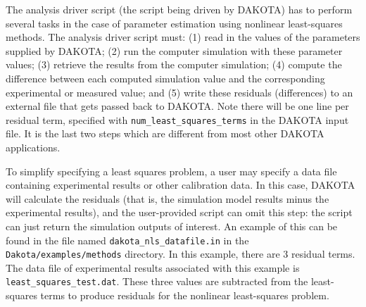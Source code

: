 The analysis driver script (the script being driven by DAKOTA) 
has to perform several tasks in the case of parameter estimation 
using nonlinear least-squares methods.  The analysis driver script 
must: (1) read in the values of the parameters supplied by DAKOTA;
(2) run the computer simulation with these parameter values;
(3) retrieve the results from the computer simulation;
(4) compute the difference between each computed simulation value
and the corresponding experimental or measured value; and 
(5) write these residuals (differences)
to an external file that gets passed back to DAKOTA.  Note there 
will be one line per residual term, specified with 
\texttt{num\_least\_squares\_terms}
in the DAKOTA input file.   It is the last two steps which are different from 
most other DAKOTA applications.  

To simplify specifying a least squares problem, a user may specify a
data file containing experimental results or other calibration data.
In this case, DAKOTA will calculate the residuals (that is, the
simulation model results minus the experimental results), and the
user-provided script can omit this step: the script can just return
the simulation outputs of interest.  An example of this can be found
in the file named \texttt{dakota\_nls\_datafile.in} in the
\texttt{Dakota/examples/methods} directory.  In this example, there
are 3 residual terms.  The data file of experimental results
associated with this example is \texttt{least\_squares\_test.dat}.
These three values are subtracted from the least-squares terms to
produce residuals for the nonlinear least-squares problem.

